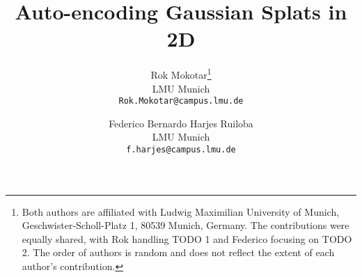 \documentclass[10pt,twocolumn,letterpaper]{article}
\title{Auto-encoding Gaussian Splats in 2D}
\author{Rok Mokotar\thanks{Both authors are affiliated with Ludwig Maximilian University of Munich, Geschwister-Scholl-Platz 1, 80539 Munich, Germany. The contributions were equally shared, with Rok handling TODO 1 and Federico focusing on TODO 2. The order of authors is random and does not reflect the extent of each author's contribution.}\\
LMU Munich\\
{\tt\small Rok.Mokotar@campus.lmu.de}
\and
Federico Bernardo Harjes Ruiloba\footnotemark[1]\\
LMU Munich\\
{\tt\small f.harjes@campus.lmu.de}
}
\begin{document}
\maketitle
    



{
    \small
    
    
}
\end{document}
